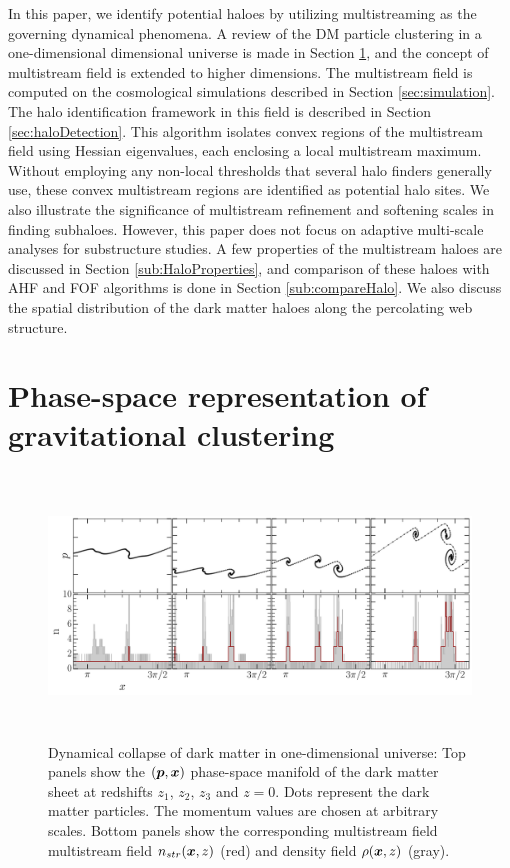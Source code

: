 \documentclass[fleqn,usenatbib,useAMS]{mnras}
\begin{document}


In this paper, we identify potential haloes by utilizing multistreaming as the governing dynamical phenomena. A review of the DM particle clustering in a one-dimensional dimensional universe is made in Section \ref{sec:HaloFormation}, and the concept of multistream field is extended to higher dimensions. The multistream field is computed on the cosmological simulations described in Section \ref{sec:simulation}. The halo identification framework in this field is described in Section \ref{sec:haloDetection}. This algorithm isolates convex regions of the multistream field using Hessian eigenvalues, each enclosing a local multistream maximum. Without employing any non-local thresholds that several halo finders generally use, these convex multistream regions are identified as potential halo sites. We also illustrate the significance of multistream refinement and softening scales in finding subhaloes. However, this paper does not focus on adaptive multi-scale analyses for substructure studies. A few properties of the multistream haloes are discussed in Section \ref{sub:HaloProperties}, and comparison of these haloes with AHF and FOF algorithms is done in Section \ref{sub:compareHalo}. We also discuss the spatial distribution of the dark matter haloes along the percolating web structure.


\section{Phase-space representation of gravitational clustering}
\label{sec:HaloFormation}


\begin{figure} 
\centering\includegraphics[height=7cm]{fig1.pdf} 
\caption{Dynamical collapse of dark matter in one-dimensional universe: Top panels show the $(\bmath{p}, \bmath{x})$ phase-space manifold of the dark matter sheet at redshifts $z_1$, $z_2$, $z_3$ and $z = 0$. Dots represent the dark matter particles. The momentum values are chosen at arbitrary scales. Bottom panels show the corresponding multistream field multistream field $n_{str}(\bmath{x}, z)$ (red) and density field $\rho(\bmath{x}, z)$ (gray). }
\label{fig:1d}
\end{figure}
\end{document}
